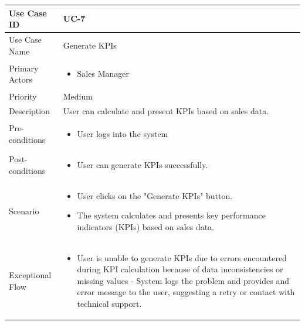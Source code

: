 \begin{tabularx}{\textwidth}{|l|X|}
\hline
Use Case ID & UC-7 \\
\hline
Use Case Name & Generate KPIs\\
\hline
Primary Actors & 
\begin{itemize}
    \item Sales Manager
\end{itemize} \\
\hline
Priority & Medium \\
\hline
Description & User can calculate and present KPIs based on sales data. \\
\hline
Pre-conditions & 
\begin{itemize}
    \item User logs into the system
\end{itemize} \\
\hline
Post-conditions & 
\begin{itemize}
    \item User can generate KPIs successfully.
\end{itemize} \\
\hline
Scenario & 
\begin{itemize}
    \item User clicks on the "Generate KPIs" button. 
    \item The system calculates and presents key performance indicators (KPIs) based on sales data.
\end{itemize}\\
\hline
Exceptional Flow & 
\begin{itemize}
    \item User is unable to generate KPIs due to errors encountered during KPI calculation because of data inconsistencies or missing values - System logs the problem and provides and error message to the user, suggesting a retry or contact with technical support.
\end{itemize}\\
\hline
\end{tabularx}

\vspace{12pt}

